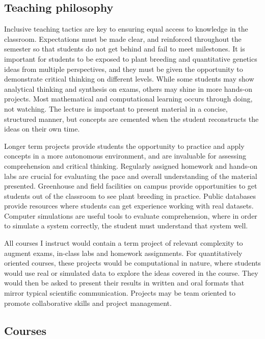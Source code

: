 \documentclass[11pt]{article}
\begin{document}
\subsection*{Teaching philosophy}

Inclusive teaching tactics are key to ensuring equal access to knowledge in the classroom. Expectations must be made clear, and reinforced throughout the semester so that students do not get behind and fail to meet milestones. It is important for students to be exposed to plant breeding and quantitative genetics ideas from multiple perspectives, and they must be given the opportunity to demonstrate critical thinking on different levels. While some students may show analytical thinking and synthesis on exams, others may shine in more hands-on projects. Most mathematical and computational learning occurs through doing, not watching. The lecture is important to present material in a concise, structured manner, but concepts are cemented when the student reconstructs the ideas on their own time.

Longer term projects provide students the opportunity to practice and apply concepts in a more autonomous environment, and are invaluable for assessing comprehension and critical thinking. Regularly assigned homework and hands-on labs are crucial for evaluating the pace and overall understanding of the material presented. Greenhouse and field facilities on campus provide opportunities to get students out of the classroom to see plant breeding in practice. Public databases provide resources where students can get experience working with real datasets. Computer simulations are useful tools to evaluate comprehension, where in order to simulate a system correctly, the student must understand that system well.

All courses I instruct would contain a term project of relevant complexity to augment exams, in-class labs and homework assignments. For quantitatively oriented courses, these projects would be computational in nature, where students would use real or simulated data to explore the ideas covered in the course. They would then be asked to present their results in written and oral formats that mirror typical scientific communication. Projects may be team oriented to promote collaborative skills and project management. %

\subsection*{Courses}
\end{document}

